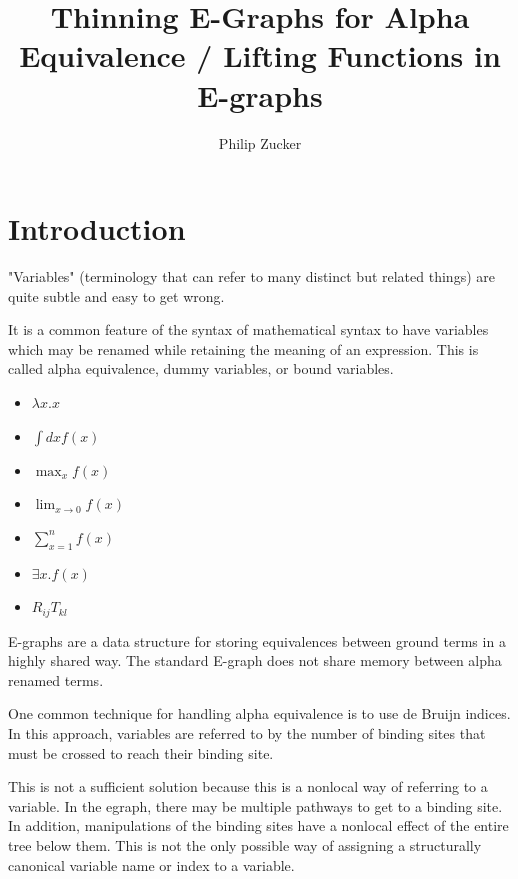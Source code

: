 \documentclass{article}%
\begin{document}
\title{Thinning E-Graphs for Alpha Equivalence / Lifting Functions in E-graphs }



\author{Philip Zucker}

\maketitle
\begin{abstract}


\end{abstract}


\section{Introduction}
"Variables" (terminology that can refer to many distinct but related things) are quite subtle and easy to get wrong.

It is a common feature of the syntax of mathematical syntax to have variables which may be renamed while retaining the meaning of an expression. This is called alpha equivalence, dummy variables, or bound variables. 

\begin{itemize}
\item $\lambda x. x$
\item $\int dx f(x)$
\item $\max_x f(x)$
\item $\lim_{x \to 0} f(x)$
\item $\sum_{x=1}^n f(x)$
\item $\exists x. f(x)$
\item $R_{ij} T_{kl}$
\end{itemize}

E-graphs are a data structure for storing equivalences between ground terms in a highly shared way. The standard E-graph does not share memory between alpha renamed terms.

One common technique for handling alpha equivalence is to use de Bruijn indices. In this approach, variables are referred to by the number of binding sites that must be crossed to reach their binding site.

This is not a sufficient solution because this is a nonlocal way of referring to a variable. In the egraph, there may be multiple pathways to get to a binding site. In addition, manipulations of the binding sites have a nonlocal effect of the entire tree below them.
This is not the only possible way of assigning a structurally canonical variable name or index to a variable.
\end{document}
